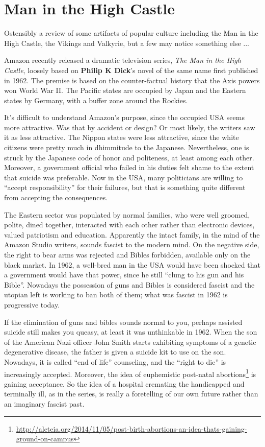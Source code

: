 \section{Man in the High Castle}

\begin{quotex}
Ostensibly a review of some artifacts of popular culture including the Man in the High Castle, the Vikings and Valkyrie, but a few may notice something else ...
\end{quotex}

Amazon recently released a dramatic television series, \emph{The Man in the High Castle}, loosely based on \textbf{Philip K Dick}'s novel of the same name first published in 1962. The premise is based on the counter-factual history that the Axis powers won World War II. The Pacific states are occupied by Japan and the Eastern states by Germany, with a buffer zone around the Rockies.

It's difficult to understand Amazon's purpose, since the occupied USA seems more attractive. Was that by accident or design? Or most likely, the writers saw it as less attractive. The Nippon states were less attractive, since the white citizens were pretty much in dhimmitude to the Japanese. Nevertheless, one is struck by the Japanese code of honor and politeness, at least among each other. Moreover, a government official who failed in his duties felt shame to the extent that suicide was preferable. Now in the USA, many politicians are willing to ``accept responsibility'' for their failures, but that is something quite different from accepting the consequences.

The Eastern sector was populated by normal families, who were well groomed, polite, dined together, interacted with each other rather than electronic devices, valued patriotism and education. Apparently the intact family, in the mind of the Amazon Studio writers, sounds fascist to the modern mind. On the negative side, the right to bear arms was rejected and Bibles forbidden, available only on the black market. In 1962, a well-bred man in the USA would have been shocked that a government would have that power, since he still ``clung to his gun and his Bible''. Nowadays the possession of guns and Bibles is considered fascist and the utopian left is working to ban both of them; what was fascist in 1962 is progressive today.

If the elimination of guns and bibles sounds normal to you, perhaps assisted suicide still makes you queasy, at least it was unthinkable in 1962. When the son of the American Nazi officer John Smith starts exhibiting symptoms of a genetic degenerative disease, the father is given a suicide kit to use on the son. Nowadays, it is called ``end of life'' counseling, and the ``right to die'' is increasingly accepted. Moreover, the idea of euphemistic post-natal abortions\footnote{\url{http://aleteia.org/2014/11/05/post-birth-abortions-an-idea-thats-gaining-ground-on-campus}} is gaining acceptance. So the idea of a hospital cremating the handicapped and terminally ill, as in the series, is really a foretelling of our own future rather than an imaginary fascist past.

